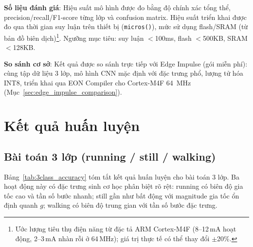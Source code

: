 \textbf{Số liệu đánh giá}: Hiệu suất mô hình được đo bằng độ chính xác tổng thể, precision/recall/F1-score từng lớp và confusion matrix. Hiệu suất triển khai được đo qua thời gian suy luận trên thiết bị (\texttt{micros()}), mức sử dụng flash/SRAM (từ bản đồ biên dịch)\footnote{Ước lượng tiêu thụ điện năng từ đặc tả ARM Cortex-M4F (8--12\,mA hoạt động, 2--3\,mA nhàn rỗi ở 64\,MHz); giá trị thực tế có thể thay đổi $\pm$20\%.}. Ngưỡng mục tiêu: suy luận $<$100ms, flash $<$500KB, SRAM $<$128KB.

\textbf{So sánh cơ sở}: Kết quả được so sánh trực tiếp với Edge Impulse (gói miễn phí): cùng tập dữ liệu 3 lớp, mô hình CNN mặc định với đặc trưng phổ, lượng tử hóa INT8, triển khai qua EON Compiler cho Cortex-M4F 64~MHz (Mục~\ref{sec:edge_impulse_comparison}).

\section{Kết quả huấn luyện}
\label{sec:training_results}

\subsection{Bài toán 3 lớp (running / still / walking)}
\label{sec:three_class}

Bảng~\ref{tab:3class_accuracy} tóm tắt kết quả huấn luyện cho bài toán 3 lớp. Ba hoạt động này có đặc trưng sinh cơ học phân biệt rõ rệt: running có biên độ gia tốc cao và tần số bước nhanh; still gần như bất động với magnitude gia tốc ổn định quanh $g$; walking có biên độ trung gian với tần số bước đặc trưng.

\begin{table}[H]
    \centering
    \caption{Kết quả huấn luyện --- bài toán 3 lớp (63 đặc trưng orientation-invariant, tập kiểm tra 156 mẫu)}
    \label{tab:3class_accuracy}
\end{table}

